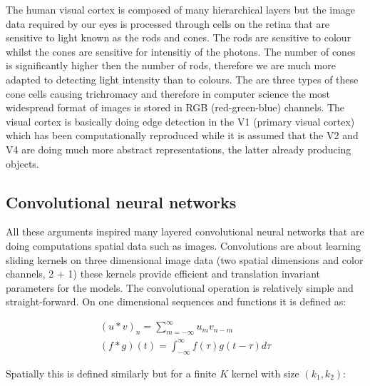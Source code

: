 \documentclass[a4paper,12pt]{article}
\begin{document}
\vspace{7mm}

\par The human visual cortex is composed of many hierarchical layers but the image data required by our eyes is processed through cells on the retina that are sensitive to light known as the rods and cones. The rods are sensitive to colour whilst the cones are sensitive for intensitiy of the photons. The number of cones is significantly higher then the number of rods, therefore we are much more adapted to detecting light intensity than to colours. The are three types of these cone cells causing trichromacy \cite{arrese2002trichromacy} and therefore in computer science the most widespread format of images is stored in RGB (red-green-blue) channels. The visual cortex is basically doing edge detection in the V1 (primary visual cortex) which has been computationally reproduced \cite{olshausen1996emergence} while it is assumed that the V2 \cite{ZiembaV2} and V4 are doing much more abstract representations, the latter already producing objects.

\vspace{7mm}

\subsection{Convolutional neural networks}

\vspace{7mm}

\par All these arguments inspired many layered convolutional neural networks that are doing computations spatial data such as images. Convolutions are about learning sliding kernels on three dimensional image data (two spatial dimensions and color channels, 2 + 1) these kernels provide efficient and translation invariant parameters for the models. The convolutional operation is relatively simple and straight-forward. On one dimensional sequences and functions it is defined as:

\begin{align*}
    (u * v)_n = \sum_{m = -\infty}^{\infty} u_{m} v_{n-m} \\
    (f * g)(t) = \int_{-\infty}^{\infty} f(\tau)g(t-\tau)d\tau
\end{align*}

\vspace{4mm}

\par Spatially this is defined similarly but for a finite $K$ kernel with size $(k_1, k_2)$:
\end{document}
